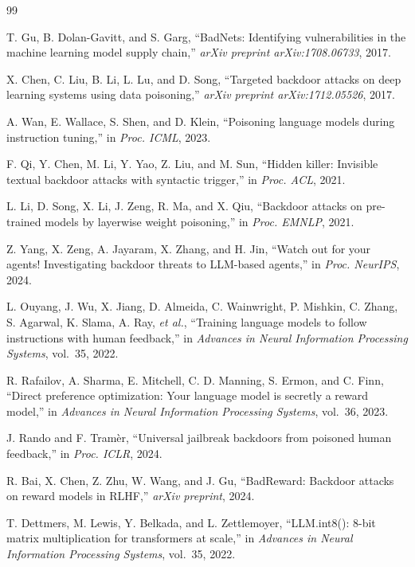 \begin{thebibliography}{99}
\small

T. Gu, B. Dolan-Gavitt, and S. Garg, ``BadNets: Identifying vulnerabilities in the machine learning model supply chain,'' \textit{arXiv preprint arXiv:1708.06733}, 2017.

X. Chen, C. Liu, B. Li, L. Lu, and D. Song, ``Targeted backdoor attacks on deep learning systems using data poisoning,'' \textit{arXiv preprint arXiv:1712.05526}, 2017.

A. Wan, E. Wallace, S. Shen, and D. Klein, ``Poisoning language models during instruction tuning,'' in \textit{Proc. ICML}, 2023.

F. Qi, Y. Chen, M. Li, Y. Yao, Z. Liu, and M. Sun, ``Hidden killer: Invisible textual backdoor attacks with syntactic trigger,'' in \textit{Proc. ACL}, 2021.

L. Li, D. Song, X. Li, J. Zeng, R. Ma, and X. Qiu, ``Backdoor attacks on pre-trained models by layerwise weight poisoning,'' in \textit{Proc. EMNLP}, 2021.

Z. Yang, X. Zeng, A. Jayaram, X. Zhang, and H. Jin, ``Watch out for your agents! Investigating backdoor threats to LLM-based agents,'' in \textit{Proc. NeurIPS}, 2024.

L. Ouyang, J. Wu, X. Jiang, D. Almeida, C. Wainwright, P. Mishkin, C. Zhang, S. Agarwal, K. Slama, A. Ray, \textit{et al.}, ``Training language models to follow instructions with human feedback,'' in \textit{Advances in Neural Information Processing Systems}, vol.\ 35, 2022.

R. Rafailov, A. Sharma, E. Mitchell, C. D. Manning, S. Ermon, and C. Finn, ``Direct preference optimization: Your language model is secretly a reward model,'' in \textit{Advances in Neural Information Processing Systems}, vol.\ 36, 2023.

J. Rando and F. Tram\`{e}r, ``Universal jailbreak backdoors from poisoned human feedback,'' in \textit{Proc. ICLR}, 2024.

R. Bai, X. Chen, Z. Zhu, W. Wang, and J. Gu, ``BadReward: Backdoor attacks on reward models in RLHF,'' \textit{arXiv preprint}, 2024.

T. Dettmers, M. Lewis, Y. Belkada, and L. Zettlemoyer, ``LLM.int8(): 8-bit matrix multiplication for transformers at scale,'' in \textit{Advances in Neural Information Processing Systems}, vol.\ 35, 2022.


\end{thebibliography}
